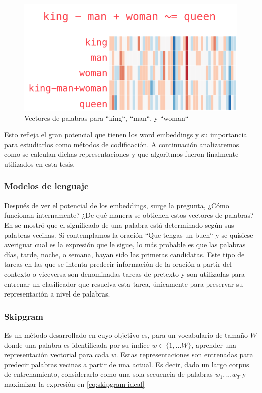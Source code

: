 \begin{figure}
    \centering
    \includegraphics[scale=0.68]{figures/king-analogy-viz.png}
    \caption{Vectores de palabras para ``king``, ``man``, y ``woman``}
    \label{fig:king-queen-example}
\end{figure}

Esto refleja el gran potencial que tienen los word embeddings y su importancia
para estudiarlos como métodos de codificación. A continuación analizaremos como
se calculan dichas representaciones y que algoritmos fueron finalmente
utilizados en esta tesis.

\subsubsection{Modelos de lenguaje}

Después de ver el potencial de los embeddings, surge la pregunta, ¿Cómo
funcionan internamente? ¿De qué manera se obtienen estos vectores de palabras?
En \citep{firth-57} se mostró que el significado de una palabra está determinado
según sus palabras vecinas. Si contemplamos la oración ``Que tengas un buen`` y
se quisiese averiguar cual es la expresión que le sigue, lo más probable es que
las palabras días, tarde, noche, o semana, hayan sido las primeras candidatas.
Este tipo de tareas en las que se intenta predecir información de la oración a
partir del contexto o viceversa son denominadas tareas de pretexto y son
utilizadas para entrenar un clasificador que resuelva esta tarea, únicamente
para preservar su representación a nivel de palabras.

\subsubsection{Skipgram}

Es un método desarrollado en \citep{Mikolov-2013} cuyo objetivo es, para un
vocabulario de tamaño $W$ donde una palabra es identificada por su índice $w \in
\{1, ... W\}$, aprender una representación vectorial para cada $w$. Estas
representaciones son entrenadas para predecir palabras vecinas a partir de una
actual. Es decir, dado un largo corpus de entrenamiento, considerarlo como una
sola secuencia de palabras $w_1, ... w_T$ y maximizar la expresión en \ref{eq:skipgram-ideal}

